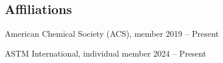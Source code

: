 \documentclass[margin,line]{resumecls}
\begin{document}
\begin{resume}

\vspace{1mm}
    \section{\mysidestyle Affiliations}

    American Chemical Society (ACS), member 2019 -- Present

    \vspace{0mm}
    ASTM International, individual member 2024 -- Present

\end{resume}
\end{document}
